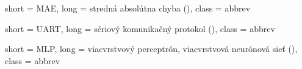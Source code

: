 
 {
	short = MAE,
	long = stredná absolútna chyba (),
	class = abbrev
}

 {
	short = UART,
	long = sériový komunikačný protokol (),
	class = abbrev
}

 {
	short = MLP,
	long = {viacvrstvový perceptrón, viacvrstvová neurónová sieť ()},
	class = abbrev
}
